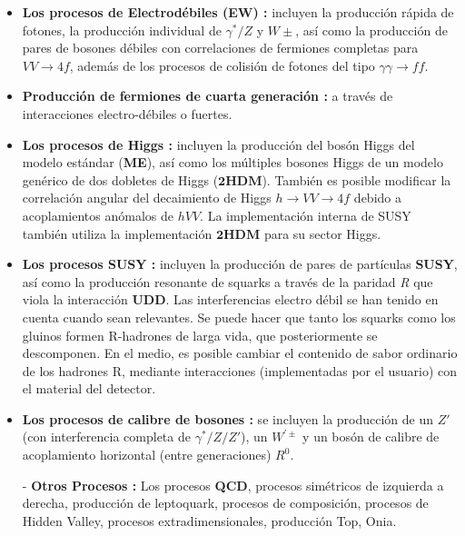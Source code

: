 \begin{itemize}
\item \textbf{Los procesos de Electrodébiles (EW) :} incluyen la producción rápida de fotones, la producción individual de $\gamma^*/Z$ y $W\pm$, así como la producción de pares de bosones débiles con correlaciones de fermiones completas para $V V \rightarrow 4f$, además de los procesos de colisión de fotones del tipo $\gamma \gamma \rightarrow ff$.
\item \textbf{Producción de fermiones de cuarta generación :} a través de interacciones electro-débiles o fuertes.
\item \textbf{Los procesos de Higgs :} incluyen la producción del bosón Higgs del modelo estándar (\textbf{ME}), así como los múltiples bosones Higgs de un modelo genérico de dos dobletes de Higgs ($\mathbf{2HDM}$). También es posible modificar la correlación angular del decaimiento de Higgs $h \rightarrow V V \rightarrow 4f$ debido a acoplamientos anómalos de $hV V$. La implementación interna de SUSY también utiliza la implementación $\mathbf{2HDM}$ para su sector Higgs.
\item \textbf{Los procesos SUSY :} incluyen la producción de pares de partículas \textbf{SUSY}, así como la producción resonante de squarks a través de la paridad \textit{R} que viola la interacción \textbf{UDD}. Las interferencias electro débil se han tenido en cuenta cuando sean relevantes. Se puede hacer que tanto los squarks como los gluinos formen R-hadrones de larga vida, que posteriormente se descomponen. En el medio, es posible cambiar el contenido de sabor ordinario de los hadrones R, mediante interacciones (implementadas por el usuario) con el material del detector.
\item \textbf{Los procesos de calibre de bosones :} se incluyen la producción de un $Z'$ (con interferencia completa de $\gamma^*/Z/Z'$), un $W^{'\pm}$ y un bosón de calibre de acoplamiento horizontal (entre generaciones) $R^0$.
\item[-] \textbf{Otros Procesos :} Los procesos \textbf{QCD}, procesos simétricos de izquierda a derecha, producción de leptoquark, procesos de composición, procesos de Hidden Valley, procesos extradimensionales, producción Top, Onia.
\end{itemize}





























